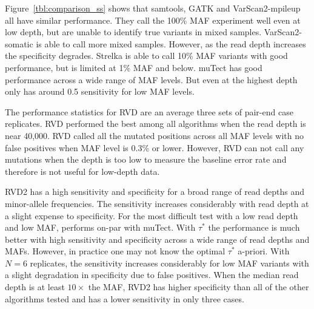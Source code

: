 \documentclass{bioinfo}
\begin{document}
Figure~\ref{tbl:comparison_ss} shows that samtools, GATK and VarScan2-mpileup all have similar performance. They call the 100\% MAF experiment well even at low depth, but are unable to identify true variants in mixed samples. VarScan2-somatic is able to call more mixed samples. However, as the read depth increases the specificity degrades. Strelka is able to call 10\% MAF variants with good performance, but is limited at 1\% MAF and below. muTect has good performance across a wide range of MAF levels. But even at the highest depth only has around 0.5 sensitivity for low MAF levels.

The performance statistics for RVD are an average three sets of pair-end case replicates. RVD performed the best among all algorithms when the read depth is near 40,000. RVD called all the mutated positions across all MAF levels with no false positives when MAF level is 0.3\% or lower. However, RVD can not call any mutations when the depth is too low to measure the baseline error rate and therefore is not useful for low-depth data.

RVD2 has a high sensitivity and specificity for a broad range of read depths and minor-allele frequencies.  The sensitivity increases considerably with read depth at a slight expense to specificity. For the most difficult test with a low read depth and low MAF, performs on-par with muTect. With $\tau^*$ the performance is much better with high sensitivity and specificity across a wide range of read depths and MAFs. However, in practice one may not know the optimal $\tau^*$ a-priori. With $N=6$ replicates, the sensitivity increases considerably for low MAF variants with a slight degradation in specificity due to false positives. When the median read depth is at least $10\times$ the MAF, RVD2 has higher specificity than all of the other algorithms tested and has a lower sensitivity in only three cases.
\end{document}
